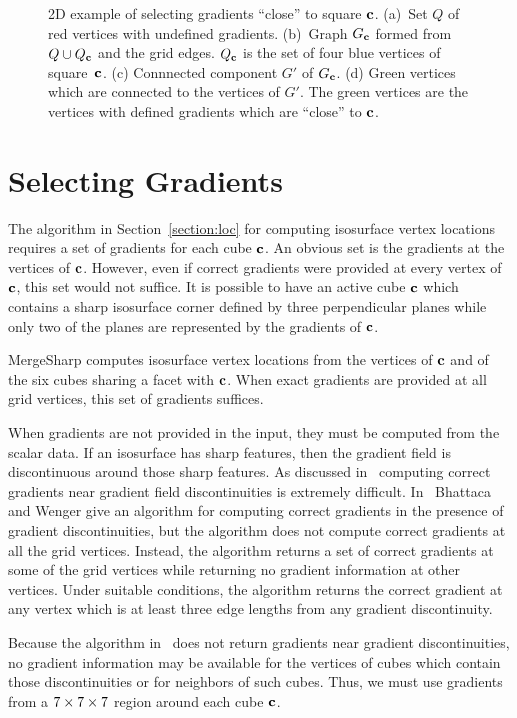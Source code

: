 \begin{figure}[t]
\caption{2D example of selecting gradients ``close'' to square $\mathbf{c}$.
(a)~Set $Q$ of red vertices with undefined gradients.
(b)~Graph $G_{\mathbf{c}}$ formed from $Q \cup Q_{\mathbf{c}}$ and the grid edges.
$Q_{\mathbf{c}}$ is the set of four blue vertices of square~$\mathbf{c}$.
(c) Connnected component $G'$ of $G_{\mathbf{c}}$.
(d) Green vertices which are connected to the vertices of $G'$.
The green vertices are the vertices with defined gradients
which are ``close'' to $\mathbf{c}$.
}
\label{fig:grad_select}
\end{figure}

\section{Selecting Gradients}
\label{section:gradients}

The algorithm in Section~\ref{section:loc}
for computing isosurface vertex locations requires
a set of gradients for each cube $\mathbf{c}$.
An obvious set is the gradients at the vertices of $\mathbf{c}$.
However, even if correct gradients were provided at every vertex of $\mathbf{c}$,
this set would not suffice.
It is possible to have an active cube $\mathbf{c}$
which contains a sharp isosurface corner
defined by three perpendicular planes
while only two of the planes are represented by the gradients of $\mathbf{c}$.

MergeSharp computes isosurface vertex locations 
from the vertices of $\mathbf{c}$ and of the six cubes sharing a facet with $\mathbf{c}$.
When exact gradients are provided at all grid vertices,
this set of gradients suffices.

When gradients are not provided in the input,
they must be computed from the scalar data.
If an isosurface has sharp features,
then the gradient field is discontinuous around those sharp features.
As discussed in~\cite{bw-crgsd-15}
computing correct gradients near gradient field discontinuities
is extremely difficult.
In~\cite{bw-crgsd-15}
Bhattaca and Wenger give an algorithm for computing correct gradients
in the presence of gradient discontinuities, but the algorithm does
not compute correct gradients at all the grid vertices.
Instead, the algorithm returns a set of correct gradients
at some of the grid vertices while returning no gradient information
at other vertices.
Under suitable conditions,
the algorithm returns the correct gradient at any vertex
which is at least three edge lengths from any gradient discontinuity.

Because the algorithm in~\cite{bw-crgsd-15}
does not return gradients near gradient discontinuities,
no gradient information may be available for the vertices 
of cubes which contain those discontinuities
or for neighbors of such cubes.
Thus, we must use gradients from a $7 \times 7 \times 7$ region around each cube $\mathbf{c}$.

